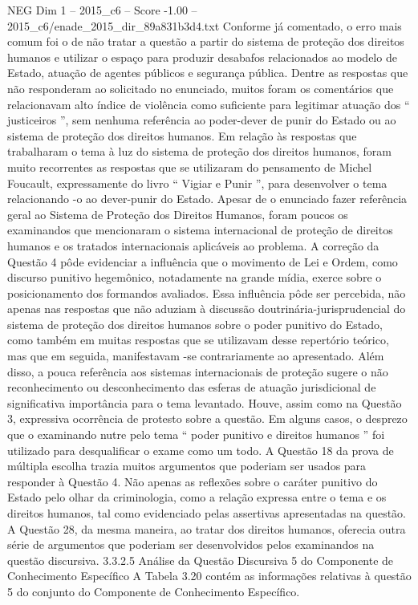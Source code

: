 \begin{textsample}{NEG Dim 1 – 2015\_c6 – Score -1.00 – 2015\_c6/enade\_2015\_dir\_89a831b3d4.txt}
Conforme já comentado, o erro mais comum foi o de não tratar a questão a partir do sistema de proteção dos direitos humanos e utilizar o espaço para produzir desabafos relacionados ao modelo de Estado, atuação de agentes públicos e segurança pública.
Dentre as respostas que não responderam ao solicitado no enunciado, muitos foram os comentários que relacionavam alto índice de violência como suficiente para legitimar atuação dos “ justiceiros ”, sem nenhuma referência ao poder-dever de punir do Estado ou ao sistema de proteção dos direitos humanos.
Em relação às respostas que trabalharam o tema à luz do sistema de proteção dos direitos humanos, foram muito recorrentes as respostas que se utilizaram do pensamento de Michel Foucault, expressamente do livro “ Vigiar e Punir ”, para desenvolver o tema relacionando -o ao dever-punir do Estado.
Apesar de o enunciado fazer referência geral ao Sistema de Proteção dos Direitos Humanos, foram poucos os examinandos que mencionaram o sistema internacional de proteção de direitos humanos e os tratados internacionais aplicáveis ao problema.
A correção da Questão 4 pôde evidenciar a influência que o movimento de Lei e Ordem, como discurso punitivo hegemônico, notadamente na grande mídia, exerce sobre o posicionamento dos formandos avaliados.
Essa influência pôde ser percebida, não apenas nas respostas que não aduziam à discussão doutrinária-jurisprudencial do sistema de proteção dos direitos humanos sobre o poder punitivo do Estado, como também em muitas respostas que se utilizavam desse repertório teórico, mas que em seguida, manifestavam -se contrariamente ao apresentado.
Além disso, a pouca referência aos sistemas internacionais de proteção sugere o não reconhecimento ou desconhecimento das esferas de atuação jurisdicional de significativa importância para o tema levantado.
Houve, assim como na Questão 3, expressiva ocorrência de protesto sobre a questão.
Em alguns casos, o desprezo que o examinando nutre pelo tema “ poder punitivo e direitos humanos ” foi utilizado para desqualificar o exame como um todo.
A Questão 18 da prova de múltipla escolha trazia muitos argumentos que poderiam ser usados para responder à Questão 4.
Não apenas as reflexões sobre o caráter punitivo do Estado pelo olhar da criminologia, como a relação expressa entre o tema e os direitos humanos, tal como evidenciado pelas assertivas apresentadas na questão.
A Questão 28, da mesma maneira, ao tratar dos direitos humanos, oferecia outra série de argumentos que poderiam ser desenvolvidos pelos examinandos na questão discursiva. 3.3.2.5 Análise da Questão Discursiva 5 do Componente de Conhecimento Específico A Tabela 3.20 contém as informações relativas à questão 5 do conjunto do Componente de Conhecimento Específico.

\end{textsample}
